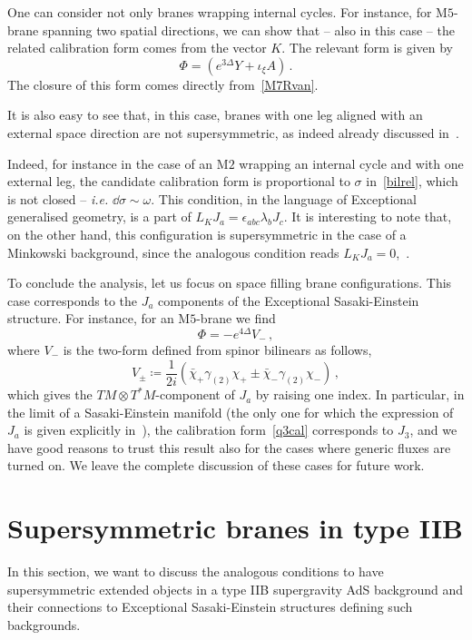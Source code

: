 \documentclass[debug]{phd}
\begin{document}
One can consider not only branes wrapping internal cycles. 
For instance, for $\mathrm{M}5$-brane spanning two spatial directions, we can show that -- also in this case -- the related calibration form comes from the vector $K$. 
The relevant form is given by
		\begin{equation}
			\Phi = (e^{3\Delta} Y + \iota_{\xi} A) \, .
		\end{equation}
The closure of this form comes directly from~\eqref{M7Rvan}.

It is also easy to see that, in this case, branes with one leg aligned with an external space direction 
are not supersymmetric, as indeed already discussed in~\cite{SanchezLoureda:2005ap}.

Indeed, for instance in the case of an $\mathrm{M}2$ wrapping an internal cycle and with one external leg, the candidate calibration form is proportional to $\sigma$ in~\eqref{bilrel}, which is not closed -- \emph{i.e.} $\dd  \sigma \sim \omega$. 
This condition, in the language of Exceptional generalised geometry, is a part of $ L_K J_a = \epsilon_{abc}  \lambda_b J_c $. 
It is interesting to note that, on the other hand, this configuration is supersymmetric in the case of a Minkowski background, since the analogous condition reads $L_K J_a = 0$,~\cite{AshmoreECY}.

To conclude the analysis, let us focus on space filling brane configurations. 
This case corresponds to the $J_a$ components of the Exceptional Sasaki-Einstein structure. 
For instance, for an $\mathrm{M}5$-brane we find
		\begin{equation}
		\label{q3cal}
			\Phi = -e^{4\Delta}{V}_-\, ,
		\end{equation}
where $V_{-}$ is the two-form defined from spinor bilinears as follows,
		\begin{equation}
		\label{Vbil}
			V_{\pm} \coloneqq \dfrac{1}{2i} \left( \bar{\chi}_+ \gamma_{(2)}\chi_+ \pm \bar{\chi}_- \gamma_{(2)}\chi_-\right)\, ,
		\end{equation}
	which gives the $TM \otimes T^*M$-component of $J_a$ by raising one index. 
	In particular, in the limit of a Sasaki-Einstein manifold (the only one for which the expression of $J_a$ is given explicitly in~\cite{AshmoreESE}), the calibration form~\eqref{q3cal} corresponds to $J_3$, and we have good reasons to trust this result also for the cases where generic fluxes are turned on. 
	We leave the complete discussion of these cases for future work.

\section{Supersymmetric branes in type IIB}
\label{sec:IIBcal}
%
In this section, we want to discuss the analogous conditions to have supersymmetric extended objects in a type IIB supergravity AdS background and their connections to Exceptional Sasaki-Einstein structures defining such backgrounds.
\end{document}
